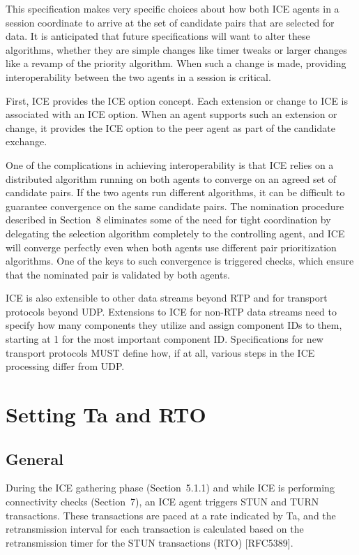 \documentclass{article}
\begin{document}
This specification makes very specific choices about how both ICE agents in a session coordinate to arrive at the set of candidate pairs that are selected for data.  It is anticipated that future specifications will want to alter these algorithms, whether they are simple changes like timer tweaks or larger changes like a revamp of the priority algorithm.  When such a change is made, providing interoperability between the two agents in a session is critical.

First, ICE provides the ICE option concept.  Each extension or change to ICE is associated with an ICE option.  When an agent supports such an extension or change, it provides the ICE option to the peer agent as part of the candidate exchange.

One of the complications in achieving interoperability is that ICE relies on a distributed algorithm running on both agents to converge on an agreed set of candidate pairs.  If the two agents run different algorithms, it can be difficult to guarantee convergence on the same candidate pairs.  The nomination procedure described in Section~8 eliminates some of the need for tight coordination by delegating the selection algorithm completely to the controlling agent, and ICE will converge perfectly even when both agents use different pair prioritization algorithms.  One of the keys to such convergence is triggered checks, which ensure that the nominated pair is validated by both agents.

ICE is also extensible to other data streams beyond RTP and for transport protocols beyond UDP.  Extensions to ICE for non-RTP data streams need to specify how many components they utilize and assign component IDs to them, starting at 1 for the most important component ID.  Specifications for new transport protocols MUST define how, if at all, various steps in the ICE processing differ from UDP.

\section{Setting Ta and RTO}

\subsection{General}

During the ICE gathering phase (Section~5.1.1) and while ICE is performing connectivity checks (Section~7), an ICE agent triggers STUN and TURN transactions.  These transactions are paced at a rate indicated by Ta, and the retransmission interval for each transaction is calculated based on the retransmission timer for the STUN transactions (RTO) [RFC5389].
\end{document}
